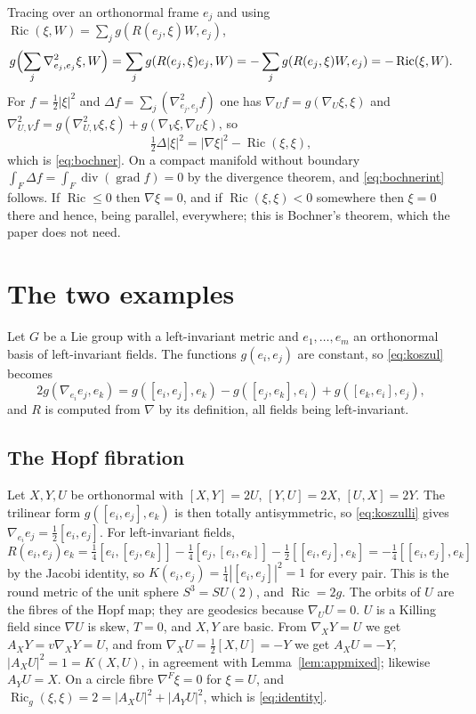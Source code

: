 \documentclass[11pt,reqno]{amsart}
\theoremstyle{plain}
\theoremstyle{definition}
\newcommand{\Ric}{\operatorname{Ric}}
\begin{document}
Tracing over an orthonormal frame $e_j$ and using $\Ric(\xi,W)=\sum_jg(R(e_j,\xi)W,e_j)$,
\begin{equation}\label{eq:apptrace}
g\Bigl(\sum_j\nabla^2_{e_j,e_j}\xi,W\Bigr)=\sum_jg(R(e_j,\xi)e_j,W)=-\sum_jg(R(e_j,\xi)W,e_j)=-\Ric(\xi,W).
\end{equation}
For $f=\tfrac12|\xi|^2$ and $\Delta f=\sum_j(\nabla^2_{e_j,e_j}f)$ one has $\nabla_Uf=g(\nabla_U\xi,\xi)$ and $\nabla^2_{U,V}f=g(\nabla^2_{U,V}\xi,\xi)+g(\nabla_V\xi,\nabla_U\xi)$, so
\begin{equation}\label{eq:appbochner}
\tfrac12\Delta|\xi|^2=|\nabla\xi|^2-\Ric(\xi,\xi),
\end{equation}
which is \eqref{eq:bochner}. On a compact manifold without boundary $\int_F\Delta f=\int_F\operatorname{div}(\operatorname{grad}f)=0$ by the divergence theorem, and \eqref{eq:bochnerint} follows. If $\Ric\le0$ then $\nabla\xi=0$, and if $\Ric(\xi,\xi)<0$ somewhere then $\xi=0$ there and hence, being parallel, everywhere; this is Bochner's theorem, which the paper does not need.

\section{The two examples}\label{app:examples}

Let $G$ be a Lie group with a left-invariant metric and $e_1,\dots,e_m$ an orthonormal basis of left-invariant fields. The functions $g(e_i,e_j)$ are constant, so \eqref{eq:koszul} becomes
\begin{equation}\label{eq:koszulli}
2g(\nabla_{e_i}e_j,e_k)=g([e_i,e_j],e_k)-g([e_j,e_k],e_i)+g([e_k,e_i],e_j),
\end{equation}
and $R$ is computed from $\nabla$ by its definition, all fields being left-invariant.

\subsection*{The Hopf fibration}
Let $X,Y,U$ be orthonormal with $[X,Y]=2U$, $[Y,U]=2X$, $[U,X]=2Y$. The trilinear form $g([e_i,e_j],e_k)$ is then totally antisymmetric, so \eqref{eq:koszulli} gives $\nabla_{e_i}e_j=\tfrac12[e_i,e_j]$. For left-invariant fields,
\[
R(e_i,e_j)e_k=\tfrac14[e_i,[e_j,e_k]]-\tfrac14[e_j,[e_i,e_k]]-\tfrac12[[e_i,e_j],e_k]=-\tfrac14[[e_i,e_j],e_k]
\]
by the Jacobi identity, so $K(e_i,e_j)=\tfrac14|[e_i,e_j]|^2=1$ for every pair. This is the round metric of the unit sphere $S^3=SU(2)$, and $\Ric=2g$. The orbits of $U$ are the fibres of the Hopf map; they are geodesics because $\nabla_UU=0$. $U$ is a Killing field since $\nabla U$ is skew, $T=0$, and $X,Y$ are basic. From $\nabla_XY=U$ we get $A_XY=v\nabla_XY=U$, and from $\nabla_XU=\tfrac12[X,U]=-Y$ we get $A_XU=-Y$, $|A_XU|^2=1=K(X,U)$, in agreement with Lemma~\ref{lem:appmixed}; likewise $A_YU=X$. On a circle fibre $\nabla^F\xi=0$ for $\xi=U$, and $\Ric_g(\xi,\xi)=2=|A_XU|^2+|A_YU|^2$, which is \eqref{eq:identity}.
\end{document}
